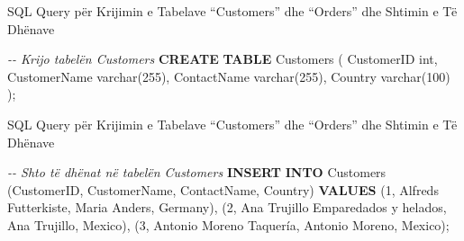 \documentclass[
  ignorenonframetext,
]{beamer}
\newenvironment{Shaded}{\begin{snugshade}}{\end{snugshade}}
\newcommand{\CommentTok}[1]{\textcolor[rgb]{0.56,0.35,0.01}{\textit{#1}}}
\newcommand{\DataTypeTok}[1]{\textcolor[rgb]{0.13,0.29,0.53}{#1}}
\newcommand{\DecValTok}[1]{\textcolor[rgb]{0.00,0.00,0.81}{#1}}
\newcommand{\KeywordTok}[1]{\textcolor[rgb]{0.13,0.29,0.53}{\textbf{#1}}}
\newcommand{\NormalTok}[1]{#1}
\newcommand{\StringTok}[1]{\textcolor[rgb]{0.31,0.60,0.02}{#1}}
\begin{document}
\begin{frame}[fragile]{SQL Query për Krijimin e Tabelave ``Customers''
dhe ``Orders'' dhe Shtimin e Të Dhënave}
\label{sql-query-puxebr-krijimin-e-tabelave-customers-dhe-orders-dhe-shtimin-e-tuxeb-dhuxebnave}

\begin{Shaded}
\begin{Highlighting}[]

\CommentTok{{-}{-} Krijo tabelën Customers}
\KeywordTok{CREATE} \KeywordTok{TABLE}\NormalTok{ Customers (}
\NormalTok{    CustomerID }\DataTypeTok{int}\NormalTok{,}
\NormalTok{    CustomerName }\DataTypeTok{varchar}\NormalTok{(}\DecValTok{255}\NormalTok{),}
\NormalTok{    ContactName }\DataTypeTok{varchar}\NormalTok{(}\DecValTok{255}\NormalTok{),}
\NormalTok{    Country }\DataTypeTok{varchar}\NormalTok{(}\DecValTok{100}\NormalTok{)}
\NormalTok{);}
\end{Highlighting}
\end{Shaded}
\end{frame}

\begin{frame}[fragile]{SQL Query për Krijimin e Tabelave ``Customers''
dhe ``Orders'' dhe Shtimin e Të Dhënave}
\label{sql-query-puxebr-krijimin-e-tabelave-customers-dhe-orders-dhe-shtimin-e-tuxeb-dhuxebnave-1}

\begin{Shaded}
\begin{Highlighting}[]

\CommentTok{{-}{-} Shto të dhënat në tabelën Customers}
\KeywordTok{INSERT} \KeywordTok{INTO}\NormalTok{ Customers (CustomerID, CustomerName, ContactName, Country) }\KeywordTok{VALUES}
\NormalTok{(}\DecValTok{1}\NormalTok{, }\StringTok{\textquotesingle{}Alfreds Futterkiste\textquotesingle{}}\NormalTok{, }\StringTok{\textquotesingle{}Maria Anders\textquotesingle{}}\NormalTok{, }\StringTok{\textquotesingle{}Germany\textquotesingle{}}\NormalTok{),}
\NormalTok{(}\DecValTok{2}\NormalTok{, }\StringTok{\textquotesingle{}Ana Trujillo Emparedados y helados\textquotesingle{}}\NormalTok{, }\StringTok{\textquotesingle{}Ana Trujillo\textquotesingle{}}\NormalTok{, }\StringTok{\textquotesingle{}Mexico\textquotesingle{}}\NormalTok{),}
\NormalTok{(}\DecValTok{3}\NormalTok{, }\StringTok{\textquotesingle{}Antonio Moreno Taquería\textquotesingle{}}\NormalTok{, }\StringTok{\textquotesingle{}Antonio Moreno\textquotesingle{}}\NormalTok{, }\StringTok{\textquotesingle{}Mexico\textquotesingle{}}\NormalTok{);}
\end{Highlighting}
\end{Shaded}
\end{frame}
\end{document}
